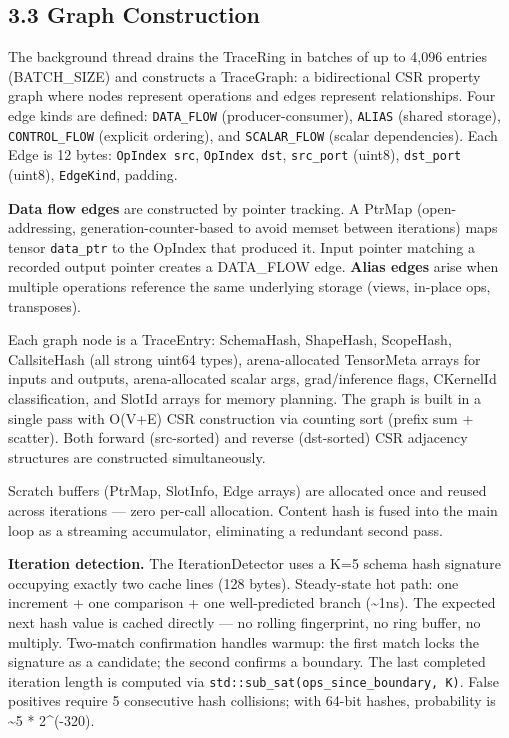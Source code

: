 \subsection{3.3 Graph Construction}\label{graph-construction}

The background thread drains the TraceRing in batches of up to 4,096 entries (BATCH\_SIZE) and constructs a TraceGraph: a bidirectional CSR property graph where nodes represent operations and edges represent relationships. Four edge kinds are defined: \texttt{DATA\_FLOW} (producer-consumer), \texttt{ALIAS} (shared storage), \texttt{CONTROL\_FLOW} (explicit ordering), and \texttt{SCALAR\_FLOW} (scalar dependencies). Each Edge is 12 bytes: \texttt{OpIndex\ src}, \texttt{OpIndex\ dst}, \texttt{src\_port} (uint8), \texttt{dst\_port} (uint8), \texttt{EdgeKind}, padding.

\textbf{Data flow edges} are constructed by pointer tracking. A PtrMap (open-addressing, generation-counter-based to avoid memset between iterations) maps tensor \texttt{data\_ptr} to the OpIndex that produced it. Input pointer matching a recorded output pointer creates a DATA\_FLOW edge. \textbf{Alias edges} arise when multiple operations reference the same underlying storage (views, in-place ops, transposes).

Each graph node is a TraceEntry: SchemaHash, ShapeHash, ScopeHash, CallsiteHash (all strong uint64 types), arena-allocated TensorMeta arrays for inputs and outputs, arena-allocated scalar args, grad/inference flags, CKernelId classification, and SlotId arrays for memory planning. The graph is built in a single pass with O(V+E) CSR construction via counting sort (prefix sum + scatter). Both forward (src-sorted) and reverse (dst-sorted) CSR adjacency structures are constructed simultaneously.

Scratch buffers (PtrMap, SlotInfo, Edge arrays) are allocated once and reused across iterations --- zero per-call allocation. Content hash is fused into the main loop as a streaming accumulator, eliminating a redundant second pass.

\textbf{Iteration detection.} The IterationDetector uses a K=5 schema hash signature occupying exactly two cache lines (128 bytes). Steady-state hot path: one increment + one comparison + one well-predicted branch (\textasciitilde1ns). The expected next hash value is cached directly --- no rolling fingerprint, no ring buffer, no multiply. Two-match confirmation handles warmup: the first match locks the signature as a candidate; the second confirms a boundary. The last completed iteration length is computed via \texttt{std::sub\_sat(ops\_since\_boundary,\ K)}. False positives require 5 consecutive hash collisions; with 64-bit hashes, probability is \textasciitilde5 * 2\^{}(-320).

